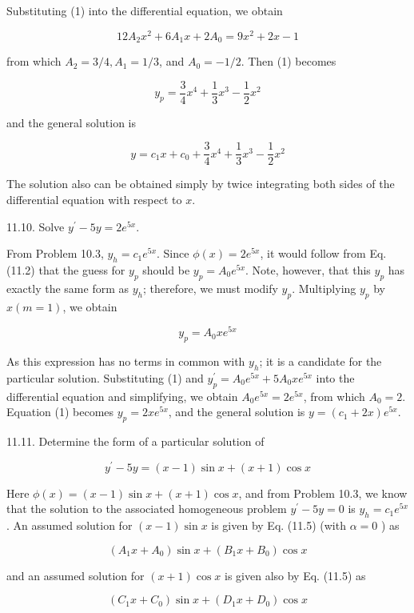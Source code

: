 \documentclass[10pt]{article}
\begin{document}
Substituting (1) into the differential equation, we obtain

$$
12 A_{2} x^{2}+6 A_{1} x+2 A_{0}=9 x^{2}+2 x-1
$$

from which $A_{2}=3 / 4, A_{1}=1 / 3$, and $A_{0}=-1 / 2$. Then (1) becomes

$$
y_{p}=\frac{3}{4} x^{4}+\frac{1}{3} x^{3}-\frac{1}{2} x^{2}
$$

and the general solution is

$$
y=c_{1} x+c_{0}+\frac{3}{4} x^{4}+\frac{1}{3} x^{3}-\frac{1}{2} x^{2}
$$

The solution also can be obtained simply by twice integrating both sides of the differential equation with respect to $x$.

11.10. Solve $y^{\prime}-5 y=2 e^{5 x}$.

From Problem 10.3, $y_{h}=c_{1} e^{5 x}$. Since $\phi(x)=2 e^{5 x}$, it would follow from Eq. (11.2) that the guess for $y_{p}$ should be $y_{p}=A_{0} e^{5 x}$. Note, however, that this $y_{p}$ has exactly the same form as $y_{h}$; therefore, we must modify $y_{p}$. Multiplying $y_{p}$ by $x(m=1)$, we obtain


\begin{equation*}
y_{p}=A_{0} x e^{5 x} \tag{1}
\end{equation*}


As this expression has no terms in common with $y_{h}$; it is a candidate for the particular solution. Substituting (1) and $y_{p}^{\prime}=A_{0} e^{5 x}+5 A_{0} x e^{5 x}$ into the differential equation and simplifying, we obtain $A_{0} e^{5 x}=2 e^{5 x}$, from which $A_{0}=2$. Equation (1) becomes $y_{p}=2 x e^{5 x}$, and the general solution is $y=\left(c_{1}+2 x\right) e^{5 x}$.

11.11. Determine the form of a particular solution of

$$
y^{\prime}-5 y=(x-1) \sin x+(x+1) \cos x
$$

Here $\phi(x)=(x-1) \sin x+(x+1) \cos x$, and from Problem 10.3, we know that the solution to the associated homogeneous problem $y^{\prime}-5 y=0$ is $y_{h}=c_{1} e^{5 x}$. An assumed solution for $(x-1) \sin x$ is given by Eq. (11.5) (with $\alpha=0$ ) as

$$
\left(A_{1} x+A_{0}\right) \sin x+\left(B_{1} x+B_{0}\right) \cos x
$$

and an assumed solution for $(x+1) \cos x$ is given also by Eq. (11.5) as

$$
\left(C_{1} x+C_{0}\right) \sin x+\left(D_{1} x+D_{0}\right) \cos x
$$
\end{document}
